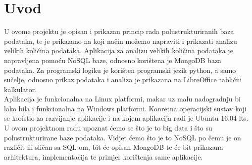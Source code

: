 \documentclass[a4paper,12pt]{foi}
\begin{document}
\maketitle

\tableofcontents

\thispagestyle{empty}

\setcounter{page}{0}

\onehalfspacing

\chapter{Uvod}
U ovome projektu je opisan i prikazan princip rada polustrukturiranih baza podataka, te je prikazano na koji način možemo napraviti i prikazati analizu velikih količina podataka.
Aplikacija za analizu velikih količina podataka je napravljena pomoću NoSQL baze, odnosno korištena je MongoDB baza podataka. Za programski logiku je korišten programski jezik python, a
samo sučelje, odnosno prikaz podataka i analiza je prikazana na LibreOffice tablični kalkulator.\\ 
Aplikacija je funkcionalna na Linux platformi, makar uz malu nadogradnju bi lako bila i funkcionalna na 
Windows platformi. Konretna operacijski sustav koji se koristio za razvijanje aplikacije i na kojem aplikacija radi je Ubuntu 16.04 lts.
U ovom projektnom radu upoznat ćemo se što je to big data i što su polustrukturirane baze podataka. Vidjet ćemo što je to NoSQL po čemu je on različit ili sličan sa SQL-om, bit će opisan MongoDB te će bit prikazana
arhitektura, implementacija te primjer korištenja same aplikacije.
\end{document}

